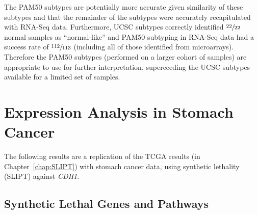 The \gls{PAM50} subtypes are potentially more accurate given similarity of these subtypes and that the remainder of the subtypes were accurately recapitulated with \gls{RNA-Seq} data. Furthermore, \gls{UCSC} subtypes correctly identified $\sfrac{22}{22}$ normal samples as ``normal-like'' and \gls{PAM50} subtyping in \gls{RNA-Seq} data had a success rate of $\sfrac{112}{113}$ (including all of those identified from microarrays). Therefore the \gls{PAM50} subtypes (performed on a larger cohort of samples) are appropriate to use for further interpretation, superceeding the \gls{UCSC} subtypes available for a limited set of samples.


\FloatBarrier

\chapter{Expression Analysis in Stomach Cancer}
\label{appendix:stad_exprSL}

The following results are a replication of the \gls{TCGA} results (in Chapter~\ref{chap:SLIPT}) with stomach cancer data, using synthetic lethality (SLIPT) against \textit{CDH1}.

\section{Synthetic Lethal Genes and Pathways} \label{appendix:stad_exprSL_genes}

